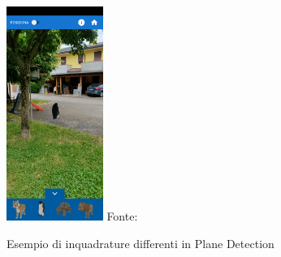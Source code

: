 \documentclass[crop=false, class=book]{standalone}
\begin{document}
\begin{figure}
{				{\includegraphics[width=0.28\textwidth]{../../resources/images/AnchorTrackable/pinglontano2.jpg}}
			}{Fonte: \url{}}	
			\caption{Esempio di inquadrature differenti in Plane Detection}
			\label{fig:augm_img}
	\end{figure}	
	\clearpage
	
\end{document}
